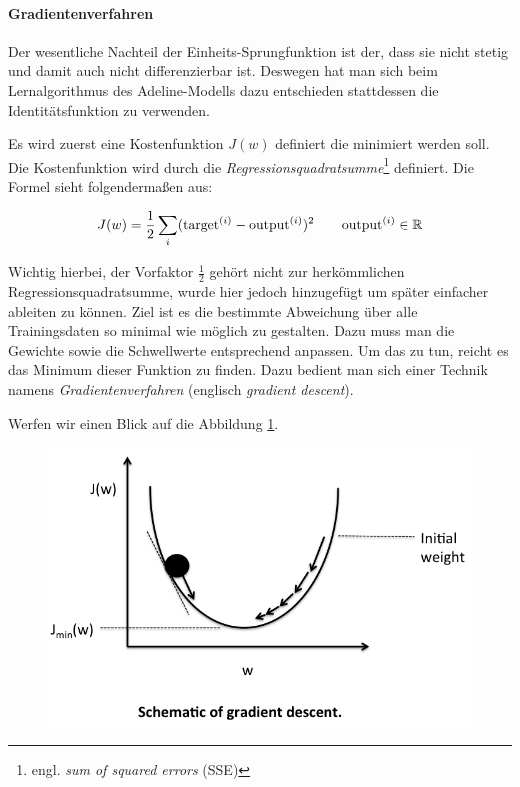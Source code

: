 \paragraph{Gradientenverfahren}
Der wesentliche Nachteil der Einheits-Sprungfunktion ist der, dass sie nicht stetig und damit auch nicht differenzierbar ist. Deswegen hat man sich beim Lernalgorithmus des Adeline-Modells dazu entschieden stattdessen die Identitätsfunktion zu verwenden. 

Es wird zuerst eine Kostenfunktion ${J(w)}$ definiert die minimiert werden soll. Die Kostenfunktion wird durch die \emph{Regressionsquadratsumme}\footnote{engl. \emph{sum of squared errors} (SSE)} definiert. Die Formel sieht folgendermaßen aus: 

\begin{equation}
J(w)  = \frac{1}{2} \sum_{i} (\text{target}^{(i)} - \text{output}^{(i)})^2 \quad \quad \text{output}^{(i)} \in \mathbb{R} \\
\end{equation}

Wichtig hierbei, der Vorfaktor ${ \frac{1}{2} }$ gehört nicht zur herkömmlichen Regressionsquadratsumme, wurde hier jedoch hinzugefügt um später einfacher ableiten zu können. Ziel ist es die bestimmte Abweichung über alle Trainingsdaten so minimal wie möglich zu gestalten. Dazu muss man die Gewichte sowie die Schwellwerte entsprechend anpassen. Um das zu tun, reicht es das Minimum dieser Funktion zu finden. Dazu bedient man sich einer Technik namens \emph{Gradientenverfahren} (englisch \emph{gradient descent}). 

Werfen wir einen Blick auf die Abbildung \ref{fig:ad_gd1}. 

\begin{figure}[!htb]
	\centering
	\includegraphics[width=.7\linewidth]{img/adeline_gd1}
	\label{fig:ad_gd1}
\end{figure}

